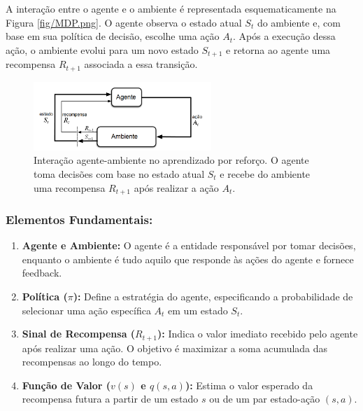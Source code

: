 A interação entre o agente e o ambiente é representada esquematicamente na Figura \ref{fig/MDP.png}. O agente observa o estado atual \( S_t \) do ambiente e, com base em sua política de decisão, escolhe uma ação \( A_t \). Após a execução dessa ação, o ambiente evolui para um novo estado \( S_{t+1} \) e retorna ao agente uma recompensa \( R_{t+1} \) associada a essa transição.

\begin{figure}[h]
    \centering
    \includegraphics[width=0.6\textwidth]{fig/MDP.png}
    \caption{Interação agente-ambiente no aprendizado por reforço. O agente toma decisões com base no estado atual \( S_t \) e recebe do ambiente uma recompensa \( R_{t+1} \) após realizar a ação \( A_t \).}
    \label{fig:agent_env_interaction}
\end{figure}

\subsubsection*{Elementos Fundamentais:}
\begin{enumerate}
    \item \textbf{Agente e Ambiente:} O agente é a entidade responsável por tomar decisões, enquanto o ambiente é tudo aquilo que responde às ações do agente e fornece feedback.
    \item \textbf{Política (\(\pi\)):} Define a estratégia do agente, especificando a probabilidade de selecionar uma ação específica \( A_t \) em um estado \( S_t \).
    \item \textbf{Sinal de Recompensa (\(R_{t+1}\)):} Indica o valor imediato recebido pelo agente após realizar uma ação. O objetivo é maximizar a soma acumulada das recompensas ao longo do tempo.
    \item \textbf{Função de Valor (\(v(s)\) e \(q(s, a)\)):} Estima o valor esperado da recompensa futura a partir de um estado \( s \) ou de um par estado-ação \( (s, a) \).
\end{enumerate}

